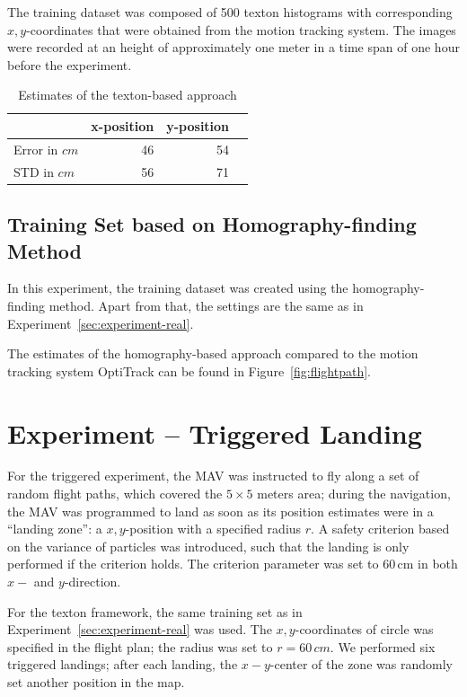 \documentclass[11pt]{report}
\begin{document}
The training dataset was composed of 500 texton histograms with
corresponding $x,y$-coordinates that were obtained from the motion
tracking system. The images were recorded at an height of
approximately one meter in a time span of one hour before the
experiment.

\begin{table}[H]
  \centering
  \begin{tabular}{lrrr}
    \toprule
    & x-position & y-position\\
    \midrule
    Error in $cm$ & 46 & 54\\
    STD in $cm$ & 56 & 71\\
    \bottomrule
  \end{tabular}
  \caption[Estimates of the texton-based approach]{Estimates of the texton-based approach}
  \label{tab:route}
\end{table}

\subsection{Training Set based on Homography-finding Method}
\label{sec:traininghomo}

In this experiment, the training dataset was created using the
homography-finding method. Apart from that, the settings are the same
as in Experiment~\ref{sec:experiment-real}.

The estimates of the homography-based approach compared to the motion
tracking system OptiTrack can be found in Figure~\ref{fig:flightpath}. 

\section{Experiment -- Triggered Landing}
\label{sec:triggered}

For the triggered experiment, the MAV was instructed to fly along a
set of random flight paths, which covered the $5 \times 5$ meters
area; during the navigation, the MAV was programmed to land as soon as
its position estimates were in a ``landing zone'': a $x,y$-position
with a specified radius $r$. A safety criterion based on the variance
of particles was introduced, such that the landing is only performed
if the criterion holds. The criterion parameter was set to 60\,cm in
both $x-$ and $y$-direction.

For the texton framework, the same training set as in
Experiment~\ref{sec:experiment-real} was used. The $x,y$-coordinates
of circle was specified in the flight plan; the radius was set to $r =
60\,cm$. We performed six triggered landings; after each landing, the
$x-y$-center of the zone was randomly set another position in the map.
\end{document}
